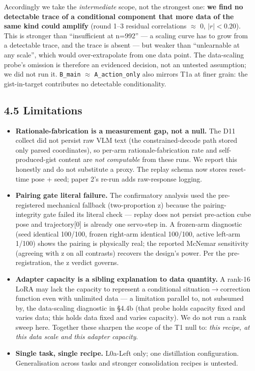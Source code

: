 Accordingly we take the \emph{intermediate} scope, not the strongest one:
\textbf{we find no detectable trace of a conditional component that more data
of the same kind could amplify} (round 1--3 residual correlations $\approx$ 0,
$|r| < 0.20$). This is stronger than ``insufficient at n=992'' --- a scaling
curve has to grow from a detectable trace, and the trace is absent ---
but weaker than ``unlearnable at any scale'', which would over-extrapolate
from one data point. The data-scaling probe's omission is therefore an
evidenced decision, not an untested assumption; we did not run it.
\texttt{B\_main} $\approx$ \texttt{A\_action\_only} also mirrors T1a at finer grain: the
gist-in-target contributes no detectable conditionality.

\subsection*{4.5 Limitations}

\begin{itemize}
\item \textbf{Rationale-fabrication is a measurement gap, not a null.} The D11
  collect did not persist raw VLM text (the constrained-decode path
  stored only parsed coordinates), so per-arm rationale-fabrication rate
  and self-produced-gist content are \emph{not computable} from these runs.
  We report this honestly and do not substitute a proxy. The replay
  schema now stores reset-time pose + seed; paper 2's re-run adds
  raw-response logging.
\item \textbf{Pairing gate literal failure.} The confirmatory analysis used the
  pre-registered mechanical fallback (two-proportion z) because the
  pairing-integrity gate failed its literal check --- replay does not
  persist pre-action cube pose and trajectory[0] is already one
  servo-step in. A frozen-arm diagnostic (seed identical 100/100,
  frozen right-arm identical 100/100, active left-arm 1/100) shows the
  pairing is physically real; the reported McNemar sensitivity
  (agreeing with z on all contrasts) recovers the design's power. Per
  the pre-registration, the z verdict governs.
\item \textbf{Adapter capacity is a sibling explanation to data quantity.} A
  rank-16 LoRA may lack the capacity to represent a conditional
  situation$\rightarrow$correction function even with unlimited data --- a limitation
  parallel to, not subsumed by, the data-scaling diagnostic in \S4.4b
  (that probe holds capacity fixed and varies data; this holds data
  fixed and varies capacity). We do not run a rank sweep here. Together
  these sharpen the scope of the T1 null to: \emph{this recipe, at this data
  scale and this adapter capacity}.
\item \textbf{Single task, single recipe.} L0a-Left only; one distillation
  configuration. Generalisation across tasks and stronger consolidation
  recipes is untested.
\end{itemize}

